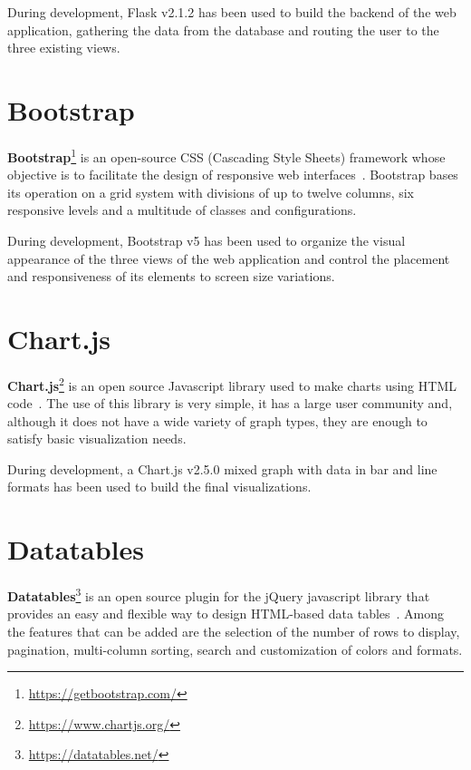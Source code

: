 \nonzeroparskip During development, Flask v2.1.2 has been used to build the backend of the web application, gathering the data from the database and routing the user to the three existing views.

\section{Bootstrap}

\nonzeroparskip \textbf{Bootstrap}\footnote{\url{https://getbootstrap.com/}} is an open-source CSS (Cascading Style Sheets) framework whose objective is to facilitate the design of responsive web interfaces~\cite{bootstrap}. Bootstrap bases its operation on a grid system with divisions of up to twelve columns, six responsive levels and a multitude of classes and configurations.

\nonzeroparskip During development, Bootstrap v5 has been used to organize the visual appearance of the three views of the web application and control the placement and responsiveness of its elements to screen size variations.

\section{Chart.js}

\nonzeroparskip \textbf{Chart.js}\footnote{\url{https://www.chartjs.org/}} is an open source Javascript library used to make charts using HTML code~\cite{w3schools_chartjs}. The use of this library is very simple, it has a large user community and, although it does not have a wide variety of graph types, they are enough to satisfy basic visualization needs.

\nonzeroparskip During development, a Chart.js v2.5.0 mixed graph with data in bar and line formats has been used to build the final visualizations.

\section{Datatables}

\nonzeroparskip \textbf{Datatables}\footnote{\url{https://datatables.net/}} is an open source plugin for the jQuery javascript library that provides an easy and flexible way to design HTML-based data tables~\cite{datatables}. Among the features that can be added are the selection of the number of rows to display, pagination, multi-column sorting, search and customization of colors and formats.

